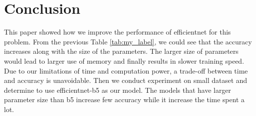 \documentclass[final]{cvpr}
\begin{document}
\section{Conclusion}

This paper showed how we improve the performance of efficientnet for this problem. From the previous Table \ref{tab:my_label}, we could see that the accuracy increases along with the size of the parameters. The larger size of parameters would lead to larger use of memory and finally results in slower training speed. Due to our limitations of time and computation power, a trade-off between time and accuracy is unavoidable. Then we conduct experiment on small dataset and determine to use efficientnet-b5 as our model. The models that have larger parameter size than b5 increase few accuracy while it increase the time spent a lot. 

{\small


}
\end{document}
